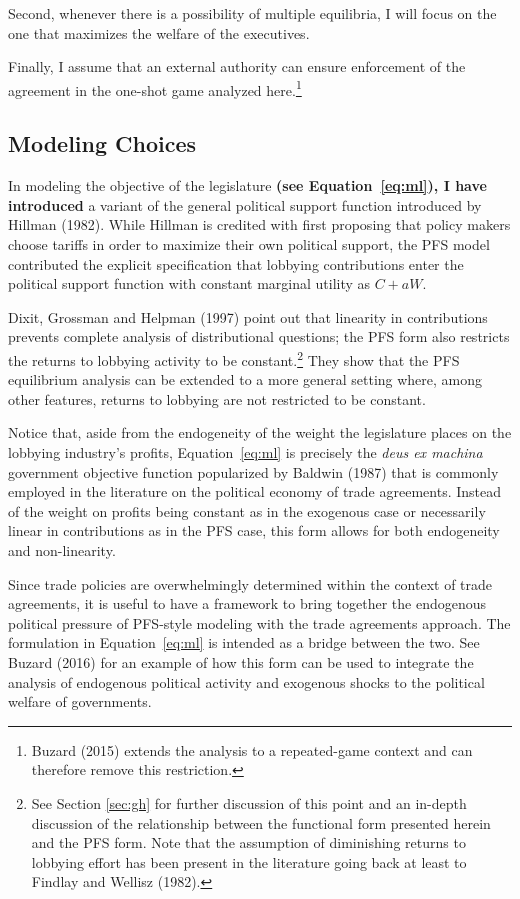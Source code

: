 \documentclass[10pt]{article}
\begin{document}
Second, whenever there is a possibility of multiple equilibria, I will focus on the one that maximizes the welfare of the executives. 

Finally, I assume that an external authority can ensure enforcement of the agreement in the one-shot game analyzed here.\footnote{Buzard (2015) extends the analysis to a repeated-game context and can therefore remove this restriction.} 


\subsection{Modeling Choices}
\label{sec:choices}

In modeling the objective of the legislature \textbf{(see Equation~\ref{eq:ml}), I have introduced} a variant of the general political support function introduced by Hillman (1982). While Hillman is credited with first proposing that policy makers choose tariffs in order to maximize their own political support, the PFS model contributed the explicit specification that lobbying contributions enter the political support function with constant marginal utility as $C + aW$.

Dixit, Grossman and Helpman (1997) point out that linearity in contributions prevents complete analysis of distributional questions; the PFS form also restricts the returns to lobbying activity to be constant.\footnote{See Section \ref{sec:gh} for further discussion of this point and an in-depth discussion of the relationship between the functional form presented herein and the PFS form. Note that the assumption of diminishing returns to lobbying effort has been present in the literature going back at least to Findlay and Wellisz (1982).} They show that the PFS equilibrium analysis can be extended to a more general setting where, among other features, returns to lobbying are not restricted to be constant. 

Notice that, aside from the endogeneity of the weight the legislature places on the lobbying industry's profits, Equation~\ref{eq:ml} is precisely the \textit{deus ex machina} government objective function popularized by Baldwin (1987) that is commonly employed in the literature on the political economy of trade agreements. Instead of the weight on profits being constant as in the exogenous case or necessarily linear in contributions as in the PFS case, this form allows for both endogeneity and non-linearity.

Since trade policies are overwhelmingly determined within the context of trade agreements, it is useful to have a framework to bring together the endogenous political pressure of PFS-style modeling with the trade agreements approach. The formulation in Equation~\ref{eq:ml} is intended as a bridge between the two. See Buzard (2016) for an example of how this form can be used to integrate the analysis of endogenous political activity and exogenous shocks to the political welfare of governments.
\end{document}
